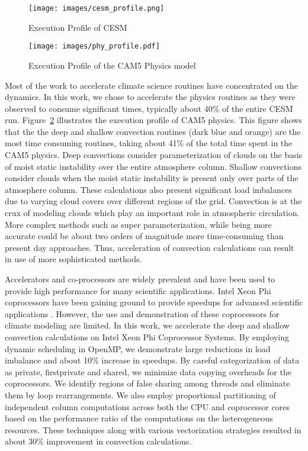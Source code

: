 \begin {figure}
\centering
\texttt{[image: images/cesm\_profile.png]}
\caption{Execution Profile of CESM}
\label{cesm_profile}
\end{figure}
\begin {figure}
\centering
\texttt{[image: images/phy\_profile.pdf]}
\caption{Execution Profile of the CAM5 Physics model}
\label{phy_profile}
\end{figure}

Most of the work to accelerate climate science routines have concentrated on the dynamics. In this work, we chose to accelerate the physics routines as they were observed to consume significant times, typically about 40\% of the entire CESM run. Figure~\ref{phy_profile} illustrates the execution profile of CAM5 physics. This figure shows that the the deep and shallow convection routines (dark blue and orange) are the most time consuming routines, taking about 41\% of the total time spent in the CAM5 physics. Deep convections consider parameterization of clouds on the basis of moist static instability over the entire atmosphere column. Shallow convections consider clouds when the moist static instability is present only over parts of the atmosphere column.  These calculations also present significant load imbalances due to varying cloud covers over different regions of the grid. Convection is at the crux of modeling clouds which play an important role in atmospheric circulation. More complex methods such as super parameterization, while being more accurate could be about two orders of magnitude more time-consuming than present day approaches. Thus, acceleration of convection calculations can result in use of more sophisticated methods.

Accelerators and co-processors are widely prevalent and have been used to provide high performance for many scientific applications. Intel{\textregistered} Xeon Phi{\texttrademark} coprocessors have been gaining ground to provide speedups for advanced scientific applications \cite{liu-swaphils-cluster2014,heybrock-latticeqcd-sc2014,luo-mica-bmc2015}. However, the use and demonstration of these coprocessors for climate modeling are limited. In this work, we accelerate the deep and shallow convection calculations on Intel{\textregistered} Xeon Phi{\texttrademark} Coprocessor Systems. By employing dynamic scheduling in OpenMP, we demonstrate large reductions in load imbalance and about 10\% increase in speedups. By careful categorization of data as private, firstprivate and shared, we minimize data copying overheads for the coprocessors. We identify regions of false sharing among threads and eliminate them by loop rearrangements. We also employ proportional partitioning of independent column computations across both the CPU and coprocessor cores based on the performance ratio of the computations on the heterogeneous resources. These techniques along with various vectorization strategies resulted in about 30\% improvement in convection calculations.


